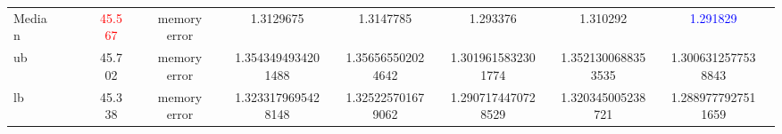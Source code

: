 \documentclass[acmsmall,review,anonymous]{acmart}\settopmatter{printfolios=true,printccs=false,printacmref=false}
\newcommand{\snumfour}[1]{{\num[round-precision=4,round-mode=figures,scientific-notation=true,output-exponent-marker = e]{#1}}}
\begin{document}
\begin{table}[]
\begin{tabular}{@{}p{0.6in}rcrcrcrcrcrcrcrcr@{}}
            \\
    Median
             &
             &
             &&    \textcolor{red}{{45.567}}
             &&    memory error
            &&   \snumfour{1.3129675}
            &&   \snumfour{1.3147785}
            &&   \snumfour{1.293376}
            &&   \snumfour{1.310292}
            &&   \textcolor{blue}{\snumfour{1.291829}}
            \\
    ub
                    &
                    &
                    &&    {45.702}
                    &&    memory error
                   &&    \snumfour{1.3543494934201488}
                   &&    \snumfour{1.356565502024642}
                   &&    \snumfour{1.3019615832301774}
                   &&    \snumfour{1.3521300688353535}
                   &&    \snumfour{1.3006312577538843}

                   \\
    lb
                    &
                    &
                    &&    {45.338}
                    &&    memory error
                   &&    \snumfour{1.3233179695428148}
                   &&    \snumfour{1.325225701679062}
                   &&    \snumfour{1.2907174470728529}
                   &&    \snumfour{1.320345005238721}
                   &&    \snumfour{1.2889777927511659}


\end{tabular}
\end{table}
\end{document}
